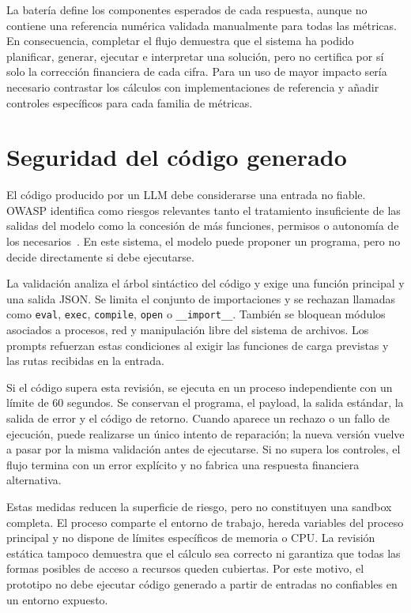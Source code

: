 La batería define los componentes esperados de cada respuesta, aunque no contiene una referencia numérica validada manualmente para todas las métricas. En consecuencia, completar el flujo demuestra que el sistema ha podido planificar, generar, ejecutar e interpretar una solución, pero no certifica por sí solo la corrección financiera de cada cifra. Para un uso de mayor impacto sería necesario contrastar los cálculos con implementaciones de referencia y añadir controles específicos para cada familia de métricas.

\section{Seguridad del código generado}

El código producido por un LLM debe considerarse una entrada no fiable. OWASP identifica como riesgos relevantes tanto el tratamiento insuficiente de las salidas del modelo como la concesión de más funciones, permisos o autonomía de los necesarios~\cite{owasp2025improperoutput,owasp2025excessiveagency}. En este sistema, el modelo puede proponer un programa, pero no decide directamente si debe ejecutarse.

La validación analiza el árbol sintáctico del código y exige una función principal y una salida JSON. Se limita el conjunto de importaciones y se rechazan llamadas como \texttt{eval}, \texttt{exec}, \texttt{compile}, \texttt{open} o \texttt{\_\_import\_\_}. También se bloquean módulos asociados a procesos, red y manipulación libre del sistema de archivos. Los prompts refuerzan estas condiciones al exigir las funciones de carga previstas y las rutas recibidas en la entrada.

Si el código supera esta revisión, se ejecuta en un proceso independiente con un límite de 60 segundos. Se conservan el programa, el payload, la salida estándar, la salida de error y el código de retorno. Cuando aparece un rechazo o un fallo de ejecución, puede realizarse un único intento de reparación; la nueva versión vuelve a pasar por la misma validación antes de ejecutarse. Si no supera los controles, el flujo termina con un error explícito y no fabrica una respuesta financiera alternativa.

Estas medidas reducen la superficie de riesgo, pero no constituyen una sandbox completa. El proceso comparte el entorno de trabajo, hereda variables del proceso principal y no dispone de límites específicos de memoria o CPU. La revisión estática tampoco demuestra que el cálculo sea correcto ni garantiza que todas las formas posibles de acceso a recursos queden cubiertas. Por este motivo, el prototipo no debe ejecutar código generado a partir de entradas no confiables en un entorno expuesto.

